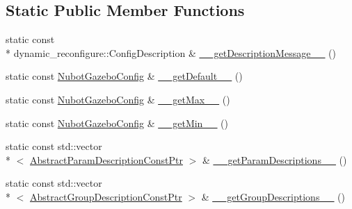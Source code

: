 \subsection*{Static Public Member Functions}
\begin{DoxyCompactItemize}
\item 
static const \\*
dynamic\-\_\-reconfigure\-::\-Config\-Description \& \hyperlink{classnubot__gazebo_1_1NubotGazeboConfig_a0673dfcd986fb5ab3954cf347b88f03f}{\-\_\-\-\_\-get\-Description\-Message\-\_\-\-\_\-} ()
\item 
static const \hyperlink{classnubot__gazebo_1_1NubotGazeboConfig}{Nubot\-Gazebo\-Config} \& \hyperlink{classnubot__gazebo_1_1NubotGazeboConfig_a3e2c55e2d9b5d7fef6faf023f99a3d92}{\-\_\-\-\_\-get\-Default\-\_\-\-\_\-} ()
\item 
static const \hyperlink{classnubot__gazebo_1_1NubotGazeboConfig}{Nubot\-Gazebo\-Config} \& \hyperlink{classnubot__gazebo_1_1NubotGazeboConfig_aec95dcba139b402a8197a20f743f0b7a}{\-\_\-\-\_\-get\-Max\-\_\-\-\_\-} ()
\item 
static const \hyperlink{classnubot__gazebo_1_1NubotGazeboConfig}{Nubot\-Gazebo\-Config} \& \hyperlink{classnubot__gazebo_1_1NubotGazeboConfig_a25e68a68083544253479b7e862e56d42}{\-\_\-\-\_\-get\-Min\-\_\-\-\_\-} ()
\item 
static const std\-::vector\\*
$<$ \hyperlink{classnubot__gazebo_1_1NubotGazeboConfig_a25b01b079fefa04f8d43df7d664dedac}{Abstract\-Param\-Description\-Const\-Ptr} $>$ \& \hyperlink{classnubot__gazebo_1_1NubotGazeboConfig_a9106e55d8fda79e3efec4cc02825d48d}{\-\_\-\-\_\-get\-Param\-Descriptions\-\_\-\-\_\-} ()
\item 
static const std\-::vector\\*
$<$ \hyperlink{classnubot__gazebo_1_1NubotGazeboConfig_aad0e4fda22f4c6a048f65a3de2f94c95}{Abstract\-Group\-Description\-Const\-Ptr} $>$ \& \hyperlink{classnubot__gazebo_1_1NubotGazeboConfig_acd702e8b8ced29943bfc83effc0d6926}{\-\_\-\-\_\-get\-Group\-Descriptions\-\_\-\-\_\-} ()
\end{DoxyCompactItemize}
